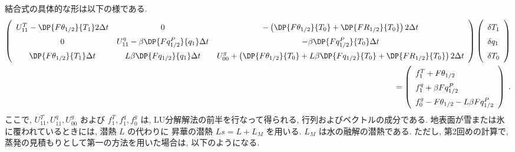 結合式の具体的な形は以下の様である. 
%
\begin{eqnarray}
  \renewcommand{\arraystretch}{1.5}
  \left( \begin{array}{ccc}
      U_{11}^T - \DP{F\theta_{1/2}}{T_1} 2 \Delta t &
      0 &
      - \left( \DP{F\theta_{1/2}}{T_0} 
                         + \DP{FR_{1/2}}{T_0}\right) 2 \Delta t \\
      0 &
      U_{11}^q - \beta \DP{Fq^P_{1/2}}{q_1} \Delta t &
      - \beta \DP{Fq^P_{1/2}}{T_0} \Delta t \\
        \DP{F\theta_{1/2}}{T_1} \Delta t &
      L \beta \DP{Fq_{1/2}}{q_1} \Delta t &
      U_{00}^g + \left(\DP{F\theta_{1/2}}{T_0}
                + L \beta \DP{Fq_{1/2}}{T_0}
                + \DP{FR_{1/2}}{T_0} \right) 2 \Delta t \\
  \end{array} \right)
  \left( \begin{array}{l}
      \delta T_1 \\ \delta q_1 \\ \delta T_0 \\
  \end{array} \right)  \nonumber \\
=  \left( \begin{array}{l}
      f_1^T + F\theta_{1/2} \\  
      f_1^q + \beta Fq^P_{1/2} \\  
      f_0^g - F\theta_{1/2} - L \beta Fq^P_{1/2} \\  
  \end{array} \right) \; .
  \label{combin-eq}
\end{eqnarray}
%
ここで, $U_{11}^T, U_{11}^q, U_{00}^g$ および $f_1^T, f_1^q, f_0^g$ は, 
LU分解解法の前半を行なって得られる, 行列およびベクトルの成分である. 
地表面が雪または氷に覆われているときには, 潜熱 $L$ の代わりに
昇華の潜熱 $Ls = L + L_M$ を用いる. $L_M$ は水の融解の潜熱である. 
%
ただし, 第2回めの計算で, 
蒸発の見積もりとして第一の方法を用いた場合は, 以下のようになる.
